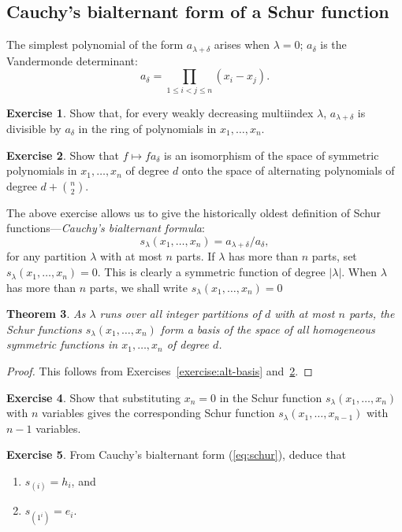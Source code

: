 \documentclass[12pt]{amsart}
\newtheorem{theorem}{Theorem}[subsection]
\theoremstyle{definition}
\theoremstyle{example}
\newtheorem{exercise}[theorem]{Exercise}
\begin{document}
\subsection{Cauchy's bialternant form of a Schur function}
\label{sec:cauchys-bialt-form}


The simplest polynomial of the form $a_{\lambda+\delta}$ arises when $\lambda=0$; $a_\delta$ is the Vandermonde determinant:
\begin{displaymath}
  a_\delta = \prod_{1\leq i<j\leq n}(x_i-x_j).
\end{displaymath}
\begin{exercise}
  Show that, for every weakly decreasing multiindex $\lambda$, $a_{\lambda+\delta}$ is divisible by $a_\delta$ in the ring of polynomials in $x_1,\dotsc,x_n$.
\end{exercise}
\begin{exercise}
  \label{exercise:vandermonde-iso}
  Show that $f\mapsto fa_\delta$ is an isomorphism of the space of symmetric polynomials in $x_1,\dotsc, x_n$ of degree $d$ onto the space of alternating polynomials of degree $d + \binom n2$. 
\end{exercise}
The above exercise allows us to give the historically oldest definition of Schur functions---\emph{Cauchy's bialternant formula}:
\begin{equation}
  \label{eq:schur}
  s_\lambda(x_1,\dotsc,x_n) = a_{\lambda+\delta}/a_\delta,
\end{equation}
for any partition $\lambda$ with at most $n$ parts.
If $\lambda$ has more than $n$ parts, set $s_\lambda(x_1,\dotsc,x_n) =0$.
This is clearly a symmetric function of degree $|\lambda|$.
When $\lambda$ has more than $n$ parts, we shall write $s_\lambda(x_1,\dotsc,x_n)=0$
\begin{theorem}
  As $\lambda$ runs over all integer partitions of $d$ with at most $n$ parts, the Schur functions $s_\lambda(x_1,\dotsc,x_n)$ form a basis of the space of all homogeneous symmetric functions in $x_1,\dotsc,x_n$ of degree $d$.
\end{theorem}
\begin{proof}
  This follows from Exercises~\ref{exercise:alt-basis} and~\ref{exercise:vandermonde-iso}.
\end{proof}
\begin{exercise}
  Show that substituting $x_n=0$ in the Schur function $s_\lambda(x_1,\dotsc, x_n)$ with $n$ variables gives the corresponding Schur function $s_\lambda(x_1,\dotsc,x_{n-1})$ with $n-1$ variables.
\end{exercise}
\begin{exercise}
  From Cauchy's bialternant form \textup{(\ref{eq:schur})}, deduce that
  \begin{enumerate}
  \item $s_{(i)} = h_i$, and
  \item $s_{(1^i)} = e_i$.
  \end{enumerate}
\end{exercise}
\end{document}
